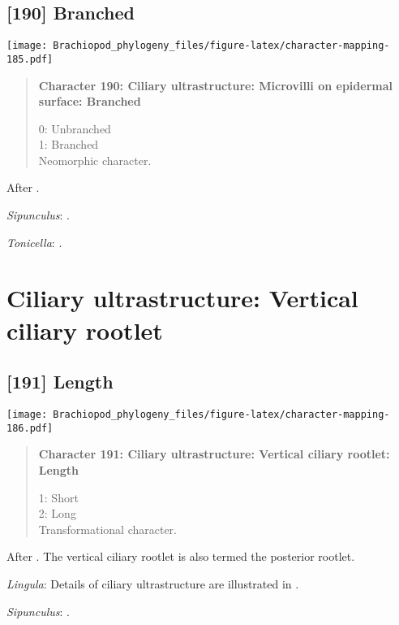 \documentclass[openany]{book}
\theoremstyle{definition}
\theoremstyle{definition}
\theoremstyle{definition}
\theoremstyle{remark}
\begin{document}
\subsection*{{[}190{]} Branched}\label{branched}

\texttt{[image: Brachiopod\_phylogeny\_files/figure-latex/character-mapping-185.pdf]}

\begin{quote}
\textbf{Character 190: Ciliary ultrastructure: Microvilli on epidermal
surface: Branched}

0: Unbranched\\
1: Branched\\
Neomorphic character.
\end{quote}

After \citet{Lundin2009}.

\hypertarget{Sipunculus-coding-190}{}
\emph{Sipunculus}: \citet{Reed1982}.

\hypertarget{Tonicella-coding-190}{}
\emph{Tonicella}: \citep{Luter1995}.

\section{Ciliary ultrastructure: Vertical ciliary
rootlet}\label{ciliary-ultrastructure-vertical-ciliary-rootlet}

\subsection*{{[}191{]} Length}\label{length}

\texttt{[image: Brachiopod\_phylogeny\_files/figure-latex/character-mapping-186.pdf]}

\begin{quote}
\textbf{Character 191: Ciliary ultrastructure: Vertical ciliary rootlet:
Length}

1: Short\\
2: Long\\
Transformational character.
\end{quote}

After \citet{Lundin2009}. The vertical ciliary rootlet is also termed
the posterior rootlet.

\hypertarget{Lingula-coding-191}{}
\emph{Lingula}: Details of ciliary ultrastructure are illustrated in
\citet{Nielsen1976}.

\hypertarget{Sipunculus-coding-191}{}
\emph{Sipunculus}: \citet{Reed1982}.
\end{document}
